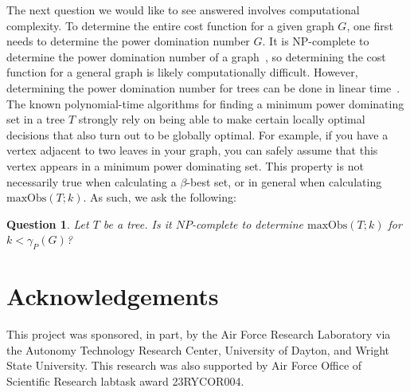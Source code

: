 \documentclass{article}
\newtheorem{question}[theorem]{Question}
\begin{document}
    The next question we would like to see answered involves computational complexity.
    To determine the entire cost function for a given graph $G$, one first needs to determine the power domination number $G$.
    It is NP-complete to determine the power domination number of a graph~\cite{HHHH2002}, so determining the cost function for a general graph is likely computationally difficult.
    However, determining the power domination number for trees can be done in linear time~\cite{HHHH2002}.
    The known polynomial-time algorithms for finding a minimum power dominating set in a tree $T$ strongly rely on being able to make certain locally optimal decisions that also turn out to be globally optimal.
    For example, if you have a vertex adjacent to two leaves in your graph, you can safely assume that this vertex appears in a minimum power dominating set.
    This property is not necessarily true when calculating a $\beta$-best set, or in general when calculating $\mathrm{maxObs}(T;k)$.
    As such, we ask the following:
    \begin{question}
        Let $T$ be a tree.
        Is it $NP$-complete to determine $\mathrm{maxObs}(T;k)$ for $k < \gamma_P(G)$? 
    \end{question}

\section{Acknowledgements}
    This project was sponsored, in part, by the Air Force Research Laboratory via the Autonomy Technology Research Center, University of Dayton, and Wright State University.
    This research was also supported by Air Force Office of Scientific Research labtask award 23RYCOR004.



\end{document}
